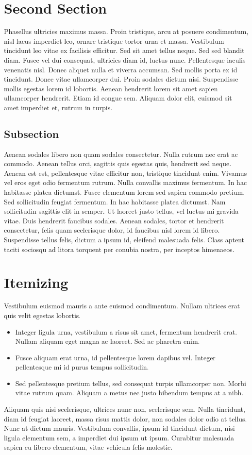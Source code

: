 \documentclass[10pt,conference]{IEEEtran}
\begin{document}
\section{Second Section}
  Phasellus ultricies maximus massa. Proin tristique, arcu at posuere condimentum, nisl lacus imperdiet leo, ornare tristique tortor urna et massa. Vestibulum tincidunt leo vitae ex facilisis efficitur. Sed sit amet tellus neque. Sed sed blandit diam. Fusce vel dui consequat, ultricies diam id, luctus nunc. Pellentesque iaculis venenatis nisl. Donec aliquet nulla et viverra accumsan. Sed mollis porta ex id tincidunt. Donec vitae ullamcorper dui. Proin sodales dictum nisi. Suspendisse mollis egestas lorem id lobortis. Aenean hendrerit lorem sit amet sapien ullamcorper hendrerit. Etiam id congue sem. Aliquam dolor elit, euismod sit amet imperdiet et, rutrum in turpis.
  \subsection{Subsection}
    Aenean sodales libero non quam sodales consectetur. Nulla rutrum nec erat ac commodo. Aenean tellus orci, sagittis quis egestas quis, hendrerit sed neque. Aenean est est, pellentesque vitae efficitur non, tristique tincidunt enim. Vivamus vel eros eget odio fermentum rutrum. Nulla convallis maximus fermentum. In hac habitasse platea dictumst. Fusce elementum lorem sed sapien commodo pretium. Sed sollicitudin feugiat fermentum. In hac habitasse platea dictumst. Nam sollicitudin sagittis elit in semper. Ut laoreet justo tellus, vel luctus mi gravida vitae. Duis hendrerit faucibus sodales. Aenean sodales, tortor et hendrerit consectetur, felis quam scelerisque dolor, id faucibus nisl lorem id libero. Suspendisse tellus felis, dictum a ipsum id, eleifend malesuada felis. Class aptent taciti sociosqu ad litora torquent per conubia nostra, per inceptos himenaeos.
  
  

\section{Itemizing}
  Vestibulum euismod mauris a ante euismod condimentum. Nullam ultrices erat quis velit egestas lobortis.
  \begin{itemize}
    \item Integer ligula urna, vestibulum a risus sit amet, fermentum hendrerit erat. Nullam aliquam eget magna ac laoreet. Sed ac pharetra enim.
    \item Fusce aliquam erat urna, id pellentesque lorem dapibus vel. Integer pellentesque mi id purus tempus sollicitudin.
    \item Sed pellentesque pretium tellus, sed consequat turpis ullamcorper non. Morbi vitae rutrum quam. Aliquam a metus nec justo bibendum tempus at a nibh.
  \end{itemize}
  Aliquam quis nisi scelerisque, ultrices nunc non, scelerisque sem. Nulla tincidunt, diam id feugiat laoreet, massa risus mattis dolor, non sodales dolor odio at tellus. Nunc at dictum mauris. Vestibulum convallis, ipsum id tincidunt dictum, nisi ligula elementum sem, a imperdiet dui ipsum ut ipsum. Curabitur malesuada sapien eu libero elementum, vitae vehicula felis molestie.
\end{document}
